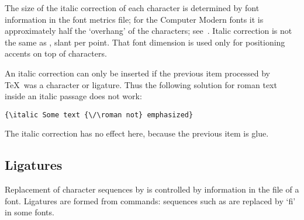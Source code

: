 The size of the italic correction of each character
is determined by font information
in the font metrics file; for the Computer Modern fonts it is
approximately half the `overhang' of the characters;
see~\cite{K:partE}.
Italic correction is not the same as , slant
per point. That font dimension is used only for positioning
accents on top of characters.

An italic correction can only be inserted if the previous item
processed 
by \TeX\ was a character or ligature. Thus the
following solution for roman text inside an italic passage
does not work:
\begin{verbatim}
{\italic Some text {\/\roman not} emphasized}
\end{verbatim}
The italic correction has no effect here,
because the previous item is glue.

\subsection{Ligatures}

Replacement of character sequences by  is controlled
by information in the  file of a font.
Ligatures are formed from  commands:
sequences such as  are replaced by `fi' in some fonts.

